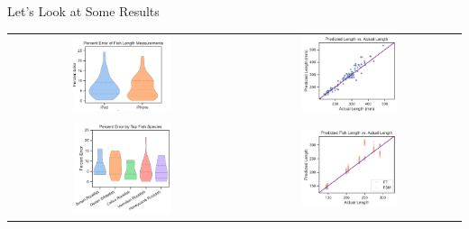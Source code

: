 \begin{frame}{Let's Look at Some Results}
    \centering
    \begin{tabular}{@{}cc@{}}
        \includegraphics[width=0.45\textwidth]{images/device_error.pdf} &
        \includegraphics[width=0.45\textwidth]{images/fsm_all_scatter.pdf} \\
        \includegraphics[width=0.45\textwidth]{images/top_species_error.pdf} &
        \includegraphics[width=0.45\textwidth]{images/fsm_ft_scatter.pdf} \\
    \end{tabular}
\end{frame}

